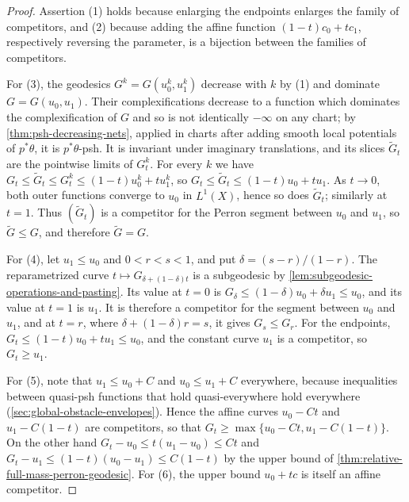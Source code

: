 \begin{proof}
Assertion (1) holds because enlarging the endpoints enlarges the family of competitors, and (2) because adding the affine function $(1-t)c_0+tc_1$, respectively reversing the parameter, is a bijection between the families of competitors.

For (3), the geodesics $G^k=G(u_0^k,u_1^k)$ decrease with $k$ by (1) and dominate $G=G(u_0,u_1)$. Their complexifications decrease to a function which dominates the complexification of $G$ and so is not identically $-\infty$ on any chart; by \cref{thm:psh-decreasing-nets}, applied in charts after adding smooth local potentials of $p^*\theta$, it is $p^*\theta$-psh. It is invariant under imaginary translations, and its slices $\widetilde G_t$ are the pointwise limits of $G^k_t$. For every $k$ we have $G_t\leq\widetilde G_t\leq G^k_t\leq(1-t)u_0^k+tu_1^k$, so $G_t\leq\widetilde G_t\leq(1-t)u_0+tu_1$. As $t\to0$, both outer functions converge to $u_0$ in $L^1(X)$, hence so does $\widetilde G_t$; similarly at $t=1$. Thus $(\widetilde G_t)$ is a competitor for the Perron segment between $u_0$ and $u_1$, so $\widetilde G\leq G$, and therefore $\widetilde G=G$.

For (4), let $u_1\leq u_0$ and $0<r<s<1$, and put $\delta=(s-r)/(1-r)$. The reparametrized curve $t\mapsto G_{\delta+(1-\delta)t}$ is a subgeodesic by \cref{lem:subgeodesic-operations-and-pasting}. Its value at $t=0$ is $G_\delta\leq(1-\delta)u_0+\delta u_1\leq u_0$, and its value at $t=1$ is $u_1$. It is therefore a competitor for the segment between $u_0$ and $u_1$, and at $t=r$, where $\delta+(1-\delta)r=s$, it gives $G_s\leq G_r$. For the endpoints, $G_t\leq(1-t)u_0+tu_1\leq u_0$, and the constant curve $u_1$ is a competitor, so $G_t\geq u_1$.

For (5), note that $u_1\leq u_0+C$ and $u_0\leq u_1+C$ everywhere, because inequalities between quasi-psh functions that hold quasi-everywhere hold everywhere (\cref{sec:global-obstacle-envelopes}). Hence the affine curves $u_0-Ct$ and $u_1-C(1-t)$ are competitors, so that $G_t\geq\max\{u_0-Ct,u_1-C(1-t)\}$. On the other hand $G_t-u_0\leq t(u_1-u_0)\leq Ct$ and $G_t-u_1\leq(1-t)(u_0-u_1)\leq C(1-t)$ by the upper bound of \cref{thm:relative-full-mass-perron-geodesic}. For (6), the upper bound $u_0+tc$ is itself an affine competitor.
\end{proof}


